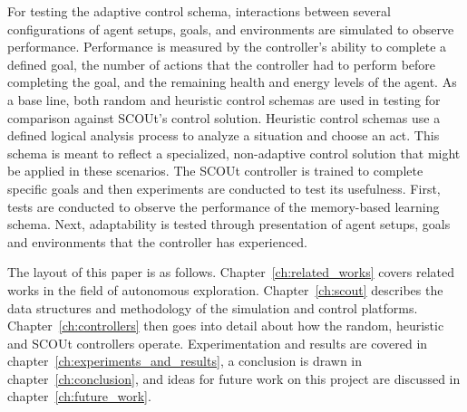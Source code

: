 For testing the adaptive control schema, interactions between several configurations of agent setups, goals, and environments are simulated to observe performance.
Performance is measured by the controller's ability to complete a defined goal, the number of actions that the controller had to perform before completing the goal, and the remaining health and energy levels of the agent.
As a base line, both random and heuristic control schemas are used in testing for comparison against SCOUt's control solution.
Heuristic control schemas use a defined logical analysis process to analyze a situation and choose an act.
This schema is meant to reflect a specialized, non-adaptive control solution that might be applied in these scenarios.
The SCOUt controller is trained to complete specific goals and then experiments are conducted to test its usefulness.
First, tests are conducted to observe the performance of the memory-based learning schema.
Next, adaptability is tested through presentation of agent setups, goals and environments that the controller has experienced.

The layout of this paper is as follows.
Chapter~\ref{ch:related_works} covers related works in the field of autonomous exploration.
Chapter~\ref{ch:scout} describes the data structures and methodology of the simulation and control platforms.
Chapter~\ref{ch:controllers} then goes into detail about how the random, heuristic and SCOUt controllers operate.
Experimentation and results are covered in chapter~\ref{ch:experiments_and_results}, a conclusion is drawn in chapter~\ref{ch:conclusion}, and ideas for future work on this project are discussed in chapter~\ref{ch:future_work}.
